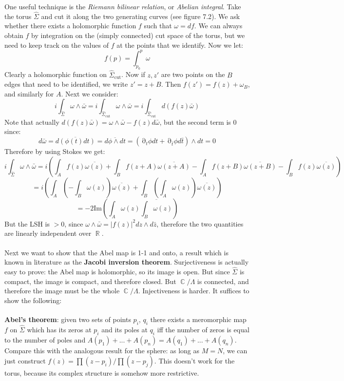 \documentclass[12 pt]{article}
\DeclareMathOperator {\p} {\partial}
\DeclareMathOperator {\R} {\mathbb{R}}
\DeclareMathOperator {\C} {\mathbb{C}}
\theoremstyle{plain}
\theoremstyle{definition}
\theoremstyle{remark}
\begin{document}
One useful technique is the \emph{Riemann bilinear relation}, or \emph{Abelian integral}. Take the torus $\hat \Sigma$ and cut it along the two generating curves (see figure 7.2). We ask whether there exists a holomorphic function $f$ such that $\omega = df$. We can always obtain $f$ by integration on the (simply connected) cut space of the torus, but we need to keep track on the values of $f$ at the points that we identify. Now we let:
\[         f(p) = \int_{p_0}^{p} \omega       \]
Clearly a holomorphic function on $\hat \Sigma_{\text{cut}}$. Now if $z, z'$ are two points on the $B$ edges that need to be identified, we write $z' = z + B$. Then $f(z') = f(z) + \omega_B$, and similarly for $A$. Next we consider:
\[   i  \int_{\hat \Sigma} \omega \wedge \bar \omega = i \int_{\hat \Sigma_{\text{cut}}} \omega \wedge \bar \omega   =  i  \int_{\hat \Sigma_{\text{cut}}} d (f(z) \bar \omega)    \]
Note that actually $d (f(z) \bar \omega) = \omega \wedge \bar \omega - f(z) d\bar \omega$, but the second term is 0 since:
\[    d \bar \omega = \overline{d(\phi(t) dt)} = \overline{d\phi \wedge dt} = (\p_t \phi dt + \p_{\bar t} \phi d\bar t) \wedge dt = 0      \]
Therefore by using Stokes we get:
\[       i  \int_{\hat \Sigma} \omega \wedge \bar \omega = i \left( \int_A f(z) \overline{\omega(z)} + \int_B f(z+A) \overline{\omega(z+A)}   - \int_A f(z+B) \overline{\omega(z+B)} -  \int_B f(z) \overline{\omega(z)}   \right)  \]
\[    =  i \left(  \int_A (- \int_B \omega(z)) \overline{\omega(z)}  + \int_B ( \int_A \omega(z)) \overline{\omega(z)} \right)     \]
\[     = - 2 \text{Im} \left( \int_A \omega(z) \overline{\int_B  \omega(z)}  \right)      \]
But the LSH is $>0$, since $\omega\wedge \bar \omega = |f(z)|^2 dz\wedge d\bar z$, therefore the two quantities are linearly independent over $\R$.
\\
\\
Next we want to show that the Abel map is 1-1 and onto, a result which is known in literature as the \textbf{Jacobi inversion theorem}. Surjectiveness is actually easy to prove: the Abel map is holomorphic, so its image is open. But since $\hat \Sigma$ is compact, the image is compact, and therefore closed. But $\C / \Lambda$ is connected, and therefore the image must be the whole $\C/\Lambda$. Injectiveness is harder. It suffices to show the following:
\\
\\
\textbf{Abel's theorem}: given two sets of points $p_i$, $q_i$ there exists a meromorphic map $f$ on $\hat \Sigma$ which has its zeros at $p_i$ and its poles at $q_i$ iff the number of zeros is equal to the number of poles and $A(p_1) + ... + A(p_n) = A(q_1) + ... + A(q_n)$. Compare this with the analogous result for the sphere: as long as $M=N$, we can just construct $f(z) = \prod (z-p_i) / \prod (z-p_j)$. This doesn't work for the torus, because its complex structure is somehow more restrictive.
\end{document}
